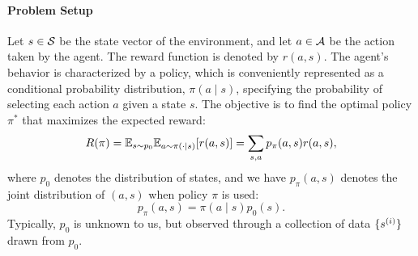 \documentclass[letterpaper,11pt]{article}
\begin{document}
\paragraph{Problem Setup}    
Let $s \in \mathcal{S}$ be the state vector of the environment, and let $a \in \mathcal{A}$ be the action taken by the agent.  
The reward function is denoted by $r(a,s)$.  
%
The agent's behavior is characterized by a policy, which is conveniently represented as a conditional probability distribution,  
$\pi(a \mid s)$,  
specifying the probability of selecting each action $a$ given a state $s$.  
%
The objective is to find the optimal policy $\pi^*$ that maximizes the expected reward:  
\[
R(\pi) = \mathbb{E}_{s\sim p_0}\mathbb{E}_{a\sim \pi(\cdot | s)} [r(a,s)] = \sum_{s,a} p_\pi(a, s) r(a,s),
\]
where $p_0$ denotes the distribution of states,
and we have $p_{\pi}(a,s)$ denotes the joint distribution of $(a,s)$ when policy $\pi$ is used: 
$$
p_\pi(a,s) = \pi(a\mid s) p_0(s). 
$$
Typically, $p_0$ is unknown to us, but observed through a collection of data $\{s^{(i)}\}$ drawn from $p_0$. 


\usetikzlibrary{arrows.meta, positioning, shadows.blur}
\begin{center}
\end{center}
\end{document}
